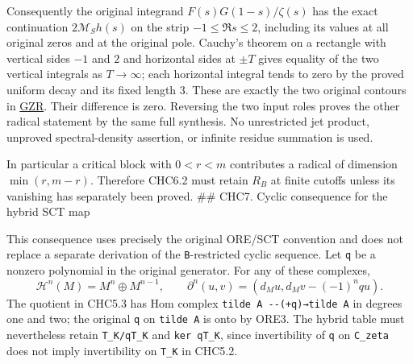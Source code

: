 Consequently the original integrand \(F(s)G(1-s)/\zeta(s)\) has the
exact continuation \(2\mathcal M_Sh(s)\) on the strip
\(-1\le\Re s\le2\), including its values at all original zeros and at
the original pole. Cauchy's theorem on a rectangle with vertical sides
\(-1\) and \(2\) and horizontal sides at \(\pm T\) gives equality of the
two vertical integrals as \(T\to\infty\); each horizontal integral tends
to zero by the proved uniform decay and its fixed length \(3\). These
are exactly the two original contours in
\href{https://github.com/KokunoYumeto/zeta-function-research-reader/blob/36a82ecca98addb8a98b48204e349737856c7223/workbenches/splitzero-tandem/continuations/20260924-cohomology-weight-and-character-lifts/original-character-lifting/tau_lifting_weights_20260924/GLOBAL_ORIGINAL_ZETA_RESIDUE_DUALITY_INDEPENDENT.md}{GZR}.
Their difference is zero. Reversing the two input roles proves the other
radical statement by the same full synthesis. No unrestricted jet
product, unproved spectral-density assertion, or infinite residue
summation is used.

In particular a critical block with \(0<r<m\) contributes a radical of
dimension \(\min(r,m-r)\). Therefore CHC6.2 must retain \(R_B\) at
finite cutoffs unless its vanishing has separately been proved. \#\#
CHC7. Cyclic consequence for the hybrid SCT map

This consequence uses precisely the original ORE/SCT convention and does
not replace a separate derivation of the \texttt{B}-restricted cyclic
sequence. Let \texttt{q} be a nonzero polynomial in the original
generator. For any of these complexes, \[
\mathscr H^n(M)=M^n\oplus M^{n-1},\qquad
\partial^n(u,v)=(d_Mu,d_Mv-(-1)^nq u).
\tag{CHC7.1}
\] The quotient in CHC5.3 has Hom complex
\texttt{tilde\ A\ -\/-(+q)→tilde\ A} in degrees one and two; the
original \texttt{q} on \texttt{tilde\ A} is onto by ORE3. The hybrid
table must nevertheless retain \texttt{T\_K/qT\_K} and
\texttt{ker\ q\textbar{}T\_K}, since invertibility of \texttt{q} on
\texttt{C\_zeta} does not imply invertibility on \texttt{T\_K} in
CHC5.2.

